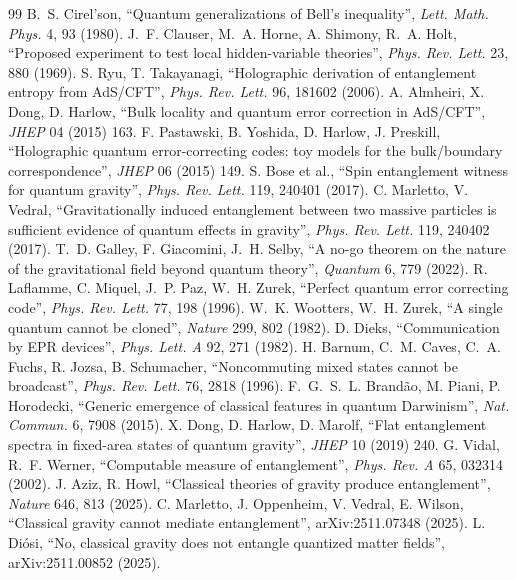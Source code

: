 \documentclass[11pt,a4paper]{article}
\theoremstyle{definition}
\theoremstyle{remark}
\begin{document}
\begin{thebibliography}{99}\small
{} B.~S. Cirel'son, ``Quantum generalizations of Bell's inequality'', \emph{Lett. Math. Phys.} 4, 93 (1980).
 J.~F. Clauser, M.~A. Horne, A. Shimony, R.~A. Holt, ``Proposed experiment to test local hidden-variable theories'',
\emph{Phys. Rev. Lett.} 23, 880 (1969).
 S. Ryu, T. Takayanagi, ``Holographic derivation of entanglement entropy from AdS/CFT'', \emph{Phys. Rev. Lett.} 96, 181602
(2006).
 A. Almheiri, X. Dong, D. Harlow, ``Bulk locality and quantum error correction in AdS/CFT'', \emph{JHEP} 04 (2015) 163.
 F. Pastawski, B. Yoshida, D. Harlow, J. Preskill, ``Holographic quantum error-correcting codes: toy models for the
bulk/boundary correspondence'', \emph{JHEP} 06 (2015) 149.
 S. Bose et al., ``Spin entanglement witness for quantum gravity'', \emph{Phys. Rev. Lett.} 119, 240401 (2017).
 C. Marletto, V. Vedral, ``Gravitationally induced entanglement between two massive particles is sufficient evidence of
quantum effects in gravity'', \emph{Phys. Rev. Lett.} 119, 240402 (2017).
 T.~D. Galley, F. Giacomini, J.~H. Selby, ``A no-go theorem on the nature of the gravitational field beyond quantum
theory'', \emph{Quantum} 6, 779 (2022).
 R. Laflamme, C. Miquel, J.~P. Paz, W.~H. Zurek, ``Perfect quantum error correcting code'', \emph{Phys. Rev. Lett.}
77, 198 (1996).
 W.~K. Wootters, W.~H. Zurek, ``A single quantum cannot be cloned'', \emph{Nature} 299, 802 (1982).
 D. Dieks, ``Communication by EPR devices'', \emph{Phys. Lett. A} 92, 271 (1982).
 H. Barnum, C.~M. Caves, C.~A. Fuchs, R. Jozsa, B. Schumacher, ``Noncommuting mixed states cannot be broadcast'',
\emph{Phys. Rev. Lett.} 76, 2818 (1996).
 F.~G.~S.~L. Brand\~ao, M. Piani, P. Horodecki, ``Generic emergence of classical features in quantum Darwinism'',
\emph{Nat. Commun.} 6, 7908 (2015).
 X. Dong, D. Harlow, D. Marolf, ``Flat entanglement spectra in fixed-area states of quantum gravity'', \emph{JHEP} 10
(2019) 240.
 G. Vidal, R.~F. Werner, ``Computable measure of entanglement'', \emph{Phys. Rev. A} 65, 032314 (2002).
 J. Aziz, R. Howl, ``Classical theories of gravity produce entanglement'', \emph{Nature} 646, 813 (2025).
 C. Marletto, J. Oppenheim, V. Vedral, E. Wilson, ``Classical gravity cannot mediate entanglement'', arXiv:2511.07348
(2025).
 L. Di\'osi, ``No, classical gravity does not entangle quantized matter fields'', arXiv:2511.00852 (2025).

\end{thebibliography}
\end{document}

